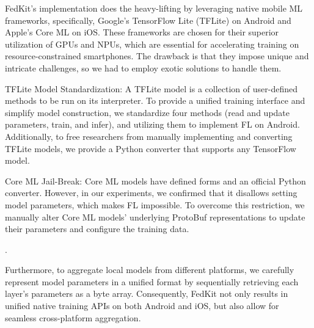 \documentclass[letterpaper]{article} %
\begin{document}
FedKit's implementation does the heavy-lifting by leveraging
native mobile ML frameworks, specifically,
Google's TensorFlow Lite (TFLite) on Android and Apple's Core ML on iOS.
These frameworks are chosen for their superior utilization of GPUs and NPUs,
which are essential for accelerating training on resource-constrained smartphones.
The drawback is that they impose unique and intricate challenges,
so we had to employ exotic solutions to handle them.
\begin{enumerate*}[label=\arabic*)]
    \item TFLite Model Standardization:
        A TFLite model is a collection of user-defined methods to be run on
        its interpreter.
        To provide a unified training interface and simplify model construction,
        we standardize four methods
        (read and update parameters, train, and infer),
        and utilizing them to implement FL on Android.
        Additionally, to free researchers from manually implementing and
        converting TFLite models,
        we provide a Python converter that supports any TensorFlow model.
    \item Core ML Jail-Break:
        Core ML models have defined forms and an official Python converter.
        However, in our experiments, we confirmed that
        it disallows setting model parameters,
        which makes FL impossible.
        To overcome this restriction, we manually alter
        Core ML models' underlying ProtoBuf representations to
        update their parameters and configure the training data.
\end{enumerate*}.

Furthermore, to aggregate local models from different platforms,
we carefully represent model parameters in a unified format by
sequentially retrieving each layer's parameters as a byte array.
Consequently,
FedKit not only results in unified native training APIs on
both Android and iOS, but also
allow for seamless cross-platform aggregation.
\end{document}
